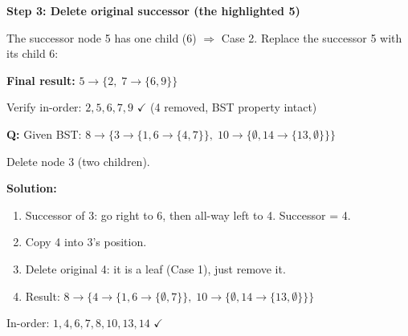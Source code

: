 \documentclass[11pt]{article}
\begin{document}
\begin{examplebox}
\textbf{Step 3: Delete original successor (the highlighted 5)}

The successor node 5 has one child (6) $\Rightarrow$ \textcolor{rustW}{Case 2}. Replace the successor 5 with its child 6:

\begin{center}
\end{center}

\textbf{Final result:} $5 \to \{2,\; 7 \to \{6, 9\}\}$

\textcolor{violetT}{Verify in-order:} $2, 5, 6, 7, 9$ $\checkmark$ (4 removed, BST property intact)
\end{examplebox}

\begin{examplebox}
\textbf{Q:} Given BST: $8 \to \{3 \to \{1, 6 \to \{4, 7\}\},\; 10 \to \{\emptyset, 14 \to \{13, \emptyset\}\}\}$

Delete node 3 (two children).

\begin{answerband}
\textbf{Solution:}
\begin{enumerate}[leftmargin=1.4em,itemsep=1pt]
    \item Successor of 3: go right to 6, then all-way left to 4. Successor = 4.
    \item Copy 4 into 3's position.
    \item Delete original 4: it is a leaf (Case 1), just remove it.
    \item Result: $8 \to \{4 \to \{1, 6 \to \{\emptyset, 7\}\},\; 10 \to \{\emptyset, 14 \to \{13, \emptyset\}\}\}$
\end{enumerate}

In-order: $1, 4, 6, 7, 8, 10, 13, 14$ $\checkmark$
\end{answerband}
\end{examplebox}
\end{document}
